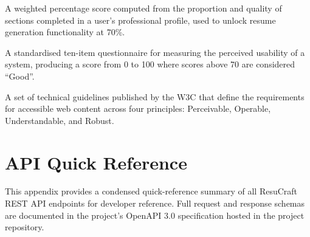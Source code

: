 \documentclass[12pt, a4paper, oneside]{report}
\begin{document}
\begin{description}[leftmargin=4cm, style=nextline]
    \item[Profile Completeness] A weighted percentage score computed from the proportion and quality of sections completed in a user's professional profile, used to unlock resume generation functionality at 70\%.

    \item[SUS (System Usability Scale)] A standardised ten-item questionnaire \cite{sus1996} for measuring the perceived usability of a system, producing a score from 0 to 100 where scores above 70 are considered ``Good''.

    \item[WCAG (Web Content Accessibility Guidelines)] A set of technical guidelines published by the W3C \cite{wcag21} that define the requirements for accessible web content across four principles: Perceivable, Operable, Understandable, and Robust.

\end{description}

\chapter{API Quick Reference}

This appendix provides a condensed quick-reference summary of all ResuCraft REST API endpoints for developer reference. Full request and response schemas are documented in the project's OpenAPI 3.0 specification \cite{openapi2021} hosted in the project repository.
\end{document}
